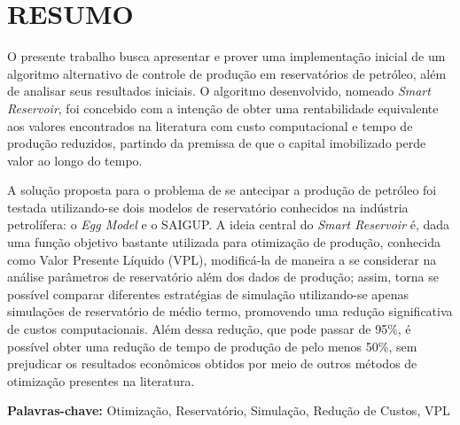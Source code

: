 
\chapter[RESUMO]{RESUMO}
{O presente trabalho busca apresentar e prover uma implementa\c{c}\~{a}o inicial de um algoritmo alternativo de controle de produ\c{c}\~{a}o em reservat\'{o}rios de petr\'{o}leo, al\'{e}m de analisar seus resultados iniciais. O algoritmo desenvolvido, nomeado \textit{Smart Reservoir}, foi concebido com a inten\c{c}\~{a}o de obter uma rentabilidade equivalente aos valores encontrados na literatura com custo computacional e tempo de produ\c{c}\~{a}o reduzidos, partindo da premissa de que o capital imobilizado perde valor ao longo do tempo. 

A solu\c{c}\~{a}o proposta para o problema de se antecipar a produ\c{c}\~{a}o de petr\'{o}leo foi testada utilizando-se dois modelos de reservat\'{o}rio conhecidos na ind\'{u}stria petrol\'{i}fera: o \textit{Egg Model} e o SAIGUP. A ideia central do \textit{Smart Reservoir} \'{e}, dada uma fun\c{c}\~{a}o objetivo bastante utilizada para otimiza\c{c}\~{a}o de produ\c{c}\~{a}o, conhecida como Valor Presente L\'{i}quido (VPL), modific\'{a}-la de maneira a se considerar na an\'{a}lise par\^{a}metros de reservat\'{o}rio al\'{e}m dos dados de produ\c{c}\~{a}o; assim, torna se poss\'{i}vel comparar diferentes estrat\'{e}gias de simula\c{c}\~{a}o utilizando-se apenas simula\c{c}\~{o}es de reservat\'{o}rio de m\'{e}dio termo, promovendo uma redu\c{c}\~{a}o significativa de custos computacionais. Al\'{e}m dessa redu\c{c}\~{a}o, que pode passar de 95\%,  \'{e} poss\'{i}vel obter uma redu\c{c}\~{a}o de tempo de produ\c{c}\~{a}o de pelo menos 50\%, sem prejudicar os resultados econ\^{o}micos obtidos por meio de outros m\'{e}todos de otimiza\c{c}\~{a}o presentes na literatura.

\textbf{Palavras-chave:} Otimiza\c{c}\~{a}o, Reservat\'{o}rio, Simula\c{c}\~{a}o, Redu\c{c}\~{a}o de Custos, VPL
}

\vspace*{2cm}

\newpage

